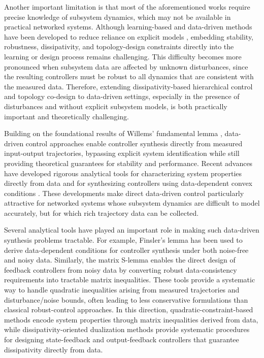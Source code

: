 \documentclass[letterpaper, 10 pt, conference]{ieeeconf}%
\newcommand{\0}{\mathbf{0}}
\begin{document}
Another important limitation is that most of the aforementioned works require precise knowledge of subsystem dynamics, which may not be available in practical networked systems. Although learning-based and data-driven methods have been developed to reduce reliance on explicit models \cite{kosaraju2021reinforcement,gama2022distributed}, embedding stability, robustness, dissipativity, and topology-design constraints directly into the learning or design process remains challenging. This difficulty becomes more pronounced when subsystem data are affected by unknown disturbances, since the resulting controllers must be robust to all dynamics that are consistent with the measured data. Therefore, extending dissipativity-based hierarchical control and topology co-design to data-driven settings, especially in the presence of disturbances and without explicit subsystem models, is both practically important and theoretically challenging.

Building on the foundational results of Willems' fundamental lemma \cite{willems2005note}, data-driven control approaches enable controller synthesis directly from measured input-output trajectories, bypassing explicit system identification while still providing theoretical guarantees for stability and performance. Recent advances have developed rigorous analytical tools for characterizing system properties directly from data \cite{de2019formulas} and for synthesizing controllers using data-dependent convex conditions \cite{berberich2020data}. These developments make direct data-driven control particularly attractive for networked systems whose subsystem dynamics are difficult to model accurately, but for which rich trajectory data can be collected.

Several analytical tools have played an important role in making such data-driven synthesis problems tractable. For example, Finsler's lemma \cite{van2021matrix} has been used to derive data-dependent conditions for controller synthesis under both noise-free and noisy data. Similarly, the matrix S-lemma \cite{van2020noisy} enables the direct design of feedback controllers from noisy data by converting robust data-consistency requirements into tractable matrix inequalities. These tools provide a systematic way to handle quadratic inequalities arising from measured trajectories and disturbance/noise bounds, often leading to less conservative formulations than classical robust-control approaches. In this direction, quadratic-constraint-based methods \cite{coulson2019data,ma2023data} encode system properties through matrix inequalities derived from data, while dissipativity-oriented dualization methods \cite{kristovic2024state,kristovic2024output} provide systematic procedures for designing state-feedback and output-feedback controllers that guarantee dissipativity directly from data.
\end{document}
